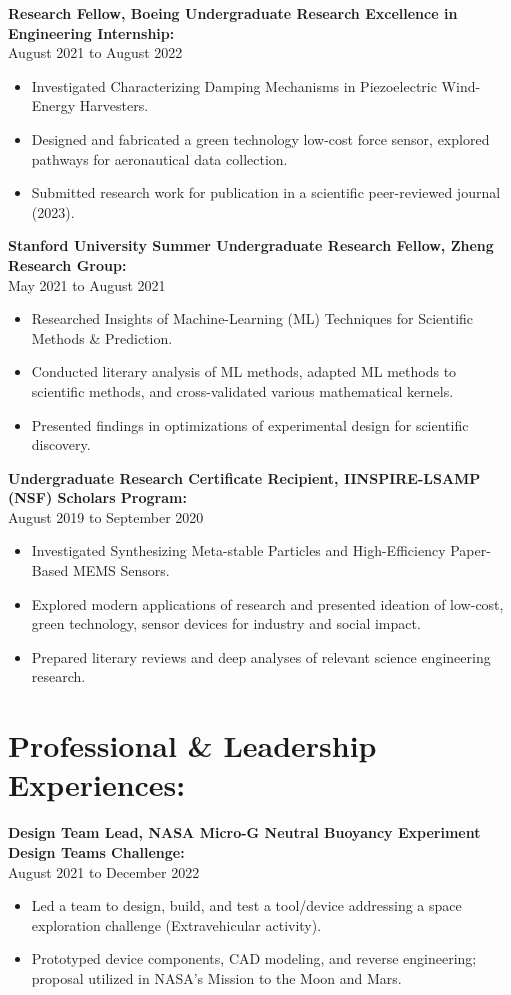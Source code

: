 \documentclass[letterpaper,10pt]{article}
\begin{document}
\textbf{Research Fellow, Boeing Undergraduate Research Excellence in Engineering Internship:} \\
August 2021 to August 2022
\begin{itemize}
    \item Investigated Characterizing Damping Mechanisms in Piezoelectric Wind-Energy Harvesters.
    \item Designed and fabricated a green technology low-cost force sensor, explored pathways for aeronautical data collection.
    \item Submitted research work for publication in a scientific peer-reviewed journal (2023).
\end{itemize}

\textbf{Stanford University Summer Undergraduate Research Fellow, Zheng Research Group:} \\
May 2021 to August 2021
\begin{itemize}
    \item Researched Insights of Machine-Learning (ML) Techniques for Scientific Methods \& Prediction.
    \item Conducted literary analysis of ML methods, adapted ML methods to scientific methods, and cross-validated various mathematical kernels.
    \item Presented findings in optimizations of experimental design for scientific discovery.
\end{itemize}

\textbf{Undergraduate Research Certificate Recipient, IINSPIRE-LSAMP (NSF) Scholars Program:} \\
August 2019 to September 2020
\begin{itemize}
    \item Investigated Synthesizing Meta-stable Particles and High-Efficiency Paper-Based MEMS Sensors.
    \item Explored modern applications of research and presented ideation of low-cost, green technology, sensor devices for industry and social impact.
    \item Prepared literary reviews and deep analyses of relevant science engineering research.
\end{itemize}

\section*{Professional \& Leadership Experiences:}

\textbf{Design Team Lead, NASA Micro-G Neutral Buoyancy Experiment Design Teams Challenge:} \\
August 2021 to December 2022
\begin{itemize}
    \item Led a team to design, build, and test a tool/device addressing a space exploration challenge (Extravehicular activity).
    \item Prototyped device components, CAD modeling, and reverse engineering; proposal utilized in NASA’s Mission to the Moon and Mars.
\end{itemize}
\end{document}
